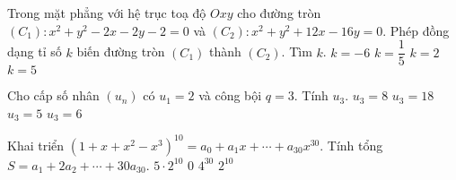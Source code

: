 \begin{ex}%
	Trong mặt phẳng với hệ trục toạ độ $Oxy$ cho đường tròn $\left({C_1}\right):x^2+y^2-2x-2y-2=0$ và $\left({C_2}\right):x^2+y^2+12x-16y=0$. Phép đồng dạng tỉ số $k$ biến đường tròn $\left({C_1}\right)$ thành $\left({C_2}\right)$. Tìm $k$.
	\choice
	{$k=-6$}
	{$k=\dfrac{1}{5}$}
	{$k=2$}
	{\True $k=5$}
\end{ex}
\begin{ex}%
	Cho cấp số nhân $\left({u_n}\right)$ có $u_1=2$ và công bội $q=3$. Tính $u_3$.
	\choice
	{$u_3=8$}
	{\True $u_3=18$}
	{$u_3=5$}
	{$u_3=6$}
\end{ex}
\begin{ex}%
	Khai triển $\left({1+x+x^2-x^3}\right)^{10}=a_0+a_1x+\cdots +a_{30}x^{30}$. Tính tổng $S=a_1+2a_2+\cdots +30a_{30}$.
	\choice
	{$5\cdot 2^{10}$}
	{\True $0$}
	{$4^{30}$}
	{$2^{10}$}
\end{ex}
